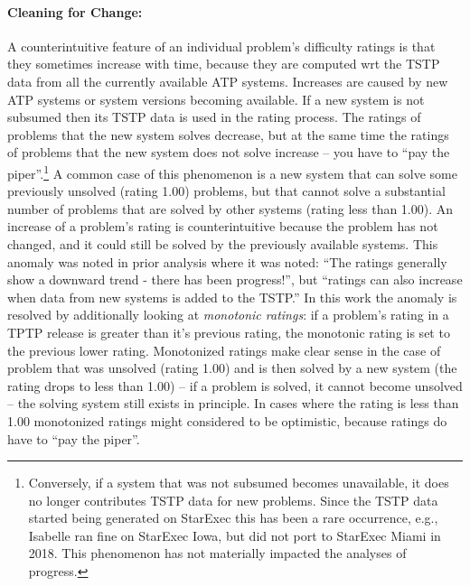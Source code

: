 \documentclass[runningheads]{llncs}
\begin{document}
\paragraph{Cleaning for Change:}
A counterintuitive feature of an individual problem's difficulty ratings is that they sometimes 
increase with time, because they are computed wrt the TSTP data from all the currently available
ATP systems.
Increases are caused by new ATP systems or system versions becoming available.
If a new system is not subsumed then its TSTP data is used in the rating process.
The ratings of problems that the new system solves decrease, but at the same time the ratings of
problems that the new system does not solve increase -- you have to ``pay the piper''.\footnote{%
Conversely, if a system that was not subsumed becomes unavailable, it does no longer contributes
TSTP data for new problems.
Since the TSTP data started being generated on StarExec this has been a rare occurrence, e.g.,
Isabelle ran fine on StarExec Iowa, but did not port to StarExec Miami in 2018.
This phenomenon has not materially impacted the analyses of progress.} 
A common case of this phenomenon is a new system that can solve some previously unsolved
(rating 1.00) problems, but that cannot solve a substantial number of problems that are solved
by other systems (rating less than 1.00).
An increase of a problem's rating is counterintuitive because the problem has not changed, and 
it could still be solved by the previously available systems.
This anomaly was noted in prior analysis \cite{Sut17} where it was noted: ``The ratings generally 
show a downward trend - there has been progress!'', but ``ratings can also increase when data 
from new systems is added to the TSTP.''
In this work the anomaly is resolved by additionally looking at {\em monotonic ratings}:
if a problem's rating in a TPTP release is greater than it's previous rating, the monotonic 
rating is set to the previous lower rating.
Monotonized ratings make clear sense in the case of problem that was unsolved (rating 1.00) and 
is then solved by a new system (the rating drops to less than 1.00) -- if a problem is 
solved, it cannot become unsolved -- the solving system still exists in principle.
In cases where the rating is less than 1.00 monotonized ratings might considered to be 
optimistic, because ratings do have to ``pay the piper''.

\end{document}
